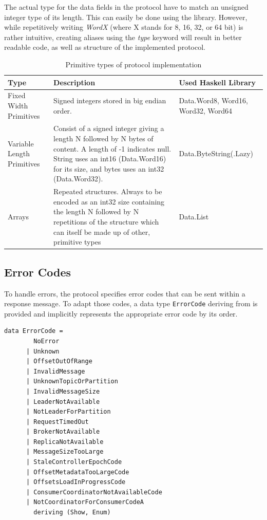 The actual type for the data fields in the protocol have to match an unsigned
integer type of its length. This can easily be done using the
library. However, while repetitively writing \textit{WordX} (where X stands for
8, 16, 32, or 64 bit) is rather intuitive, creating aliases using the
\textit{type} keyword will result in better readable code, as well as structure
of the implemented protocol. 

\begin{table}[H]
    \begin{tabular}{| p{3cm}| p{7cm} | p{5cm} |}
\hline
\textbf{Type} & \textbf{Description} & \textbf{Used Haskell Library} \\ \hline
Fixed Width Primitives     & Signed integers stored in big endian order.
& Data.Word8, Word16, Word32, Word64 \\ \hline
Variable Length Primitives & Consist of a signed integer giving a length N
followed by N bytes of content. A length of -1 indicates null. String uses an
int16 (Data.Word16) for its size, and bytes uses an int32 (Data.Word32).    &
Data.ByteString(.Lazy) \\ \hline
Arrays                     & Repeated structures. Always to be encoded as an int32
size containing the length N followed by N repetitions of the structure which
can itself be made up of other, primitive types & Data.List                          \\ \hline
\end{tabular}
 \caption{Primitive types of protocol implementation}
\end{table}

\subsection{Error Codes}
\label{subsec:protocol-types-error-codes}

To handle errors, the protocol specifies error codes that can be sent within a
response message. To adapt those codes, a data type \lstinline{ErrorCode}
deriving from
 is provided and implicitly represents the
appropriate error code by its order.

\begin{lstlisting}[caption={Defined types for ErrorCode}]
data ErrorCode =
        NoError
      | Unknown
      | OffsetOutOfRange
      | InvalidMessage
      | UnknownTopicOrPartition
      | InvalidMessageSize
      | LeaderNotAvailable
      | NotLeaderForPartition
      | RequestTimedOut
      | BrokerNotAvailable
      | ReplicaNotAvailable
      | MessageSizeTooLarge
      | StaleControllerEpochCode
      | OffsetMetadataTooLargeCode
      | OffsetsLoadInProgressCode
      | ConsumerCoordinatorNotAvailableCode
      | NotCoordinatorForConsumerCodeA
        deriving (Show, Enum)
\end{lstlisting}

